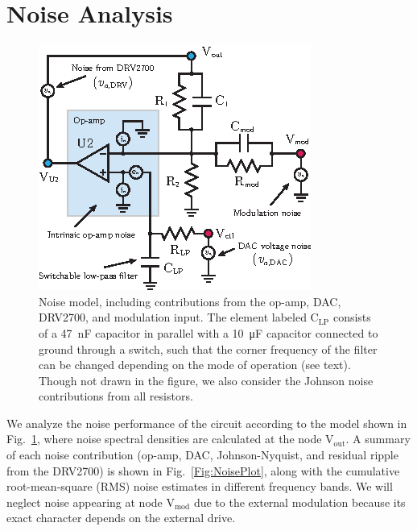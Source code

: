 \documentclass[aip,rsi,reprint]{revtex4-1} %
\begin{document}
\section{Noise Analysis}
\label{Sec:NoiseAnalysis}

\begin{figure}[t]
\includegraphics[width=\columnwidth]{NoiseModel}
\caption{Noise model, including contributions from the op-amp, DAC, DRV2700, and modulation input. The element labeled $\text{C}_\text{LP}$ consists of a \SI{47}{\nano\farad} capacitor in parallel with a \SI{10}{\micro\farad} capacitor connected to ground through a switch, such that the corner frequency of the filter can be changed depending on the mode of operation  (see text). Though not drawn in the figure, we also consider the Johnson noise contributions from all resistors.
\label{Fig:NoiseModel}}
\end{figure}

We analyze the noise performance of the circuit according to the model shown in Fig.~\ref{Fig:NoiseModel}, where noise spectral densities are calculated at the node $\text{V}_\text{out}$.
A summary of each noise contribution (op-amp, DAC, Johnson-Nyquist, and residual ripple from the DRV2700) is shown in Fig.~\ref{Fig:NoisePlot}, along with the cumulative root-mean-square (RMS) noise estimates in different frequency bands.
We will neglect noise appearing at node $\text{V}_\text{mod}$ due to the external modulation because its exact character depends on the external drive.
\end{document}
